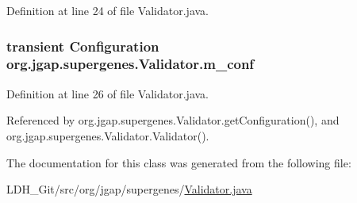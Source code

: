 Definition at line 24 of file Validator.\-java.

\hypertarget{classorg_1_1jgap_1_1supergenes_1_1_validator_af42bcaebed258b484e7e6b8d4fe2d10e}{
\subsubsection[{m\-\_\-conf}]{\setlength{\rightskip}{0pt plus 5cm}transient {\bf Configuration} org.\-jgap.\-supergenes.\-Validator.\-m\-\_\-conf\hspace{0.3cm}{\ttfamily [private]}}}\label{classorg_1_1jgap_1_1supergenes_1_1_validator_af42bcaebed258b484e7e6b8d4fe2d10e}


Definition at line 26 of file Validator.\-java.



Referenced by org.\-jgap.\-supergenes.\-Validator.\-get\-Configuration(), and org.\-jgap.\-supergenes.\-Validator.\-Validator().



The documentation for this class was generated from the following file\-:\begin{DoxyCompactItemize}
\item 
L\-D\-H\-\_\-\-Git/src/org/jgap/supergenes/\hyperlink{_validator_8java}{Validator.\-java}\end{DoxyCompactItemize}
